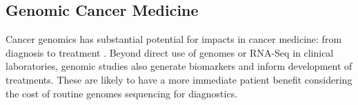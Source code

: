 



\subsection{Genomic Cancer Medicine}
Cancer \glspl{genomic} has substantial potential for impacts in cancer medicine: from diagnosis to treatment \citep{Roychowdhury2016, Tran2012}. Beyond direct use of \glspl{genome} or \gls{RNA-Seq} in clinical laboratories, \gls{genomic} studies also generate biomarkers and inform development of \glspl{treatment}. These are likely to have a more immediate patient benefit considering the cost of routine \glspl{genome} sequencing for diagnostics. %

